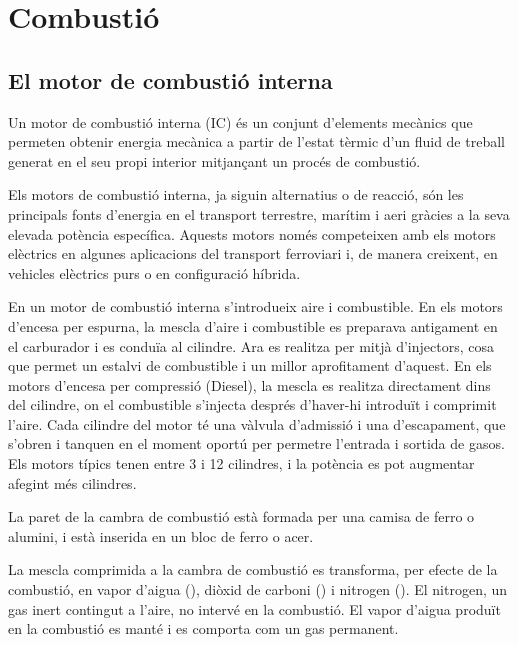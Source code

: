 \chapter{Combustió}

\tableofcontents\newpage

\section{El motor de combustió interna}

Un motor de combustió interna (IC) és un conjunt d'elements mecànics que permeten obtenir energia mecànica a partir de l'estat tèrmic d'un fluid de treball generat en el seu propi interior mitjançant un procés de combustió.
 
Els motors de combustió interna, ja siguin alternatius o de reacció, són les principals fonts d'energia en el transport terrestre, marítim i aeri gràcies a la seva elevada potència específica. Aquests motors només competeixen amb els motors elèctrics en algunes aplicacions del transport ferroviari i, de manera creixent, en vehicles elèctrics purs o en configuració híbrida\cite{de_antonio_motores_2015}. 

En un motor de combusti\'o interna s'introdueix aire i combustible. En els motors d'encesa per espurna, la mescla d'aire i combustible es preparava antigament en el carburador i es condu\"ia al cilindre. Ara es realitza per mitj\`a d'injectors, cosa que permet un estalvi de combustible i un millor aprofitament d'aquest. En els motors d'encesa per compressi\'o (Diesel), la mescla es realitza directament dins del cilindre, on el combustible s'injecta despr\'es d'haver-hi introdu\"it i comprimit l'aire. Cada cilindre del motor t\'e una v\`alvula d'admissi\'o i una d'escapament, que s'obren i tanquen en el moment oport\'u per permetre l'entrada i sortida de gasos. Els motors típics tenen entre 3 i 12 cilindres, i la pot\`encia es pot augmentar afegint m\'es cilindres.

La paret de la cambra de combustió està formada per una camisa de ferro o alumini, i està inserida en un bloc de ferro o acer.

La mescla comprimida a la cambra de combusti\'o es transforma, per efecte de la combusti\'o, en vapor d'aigua (), di\`oxid de carboni () i nitrogen (). El nitrogen, un gas inert contingut a l'aire, no interv\'e en la combusti\'o. El vapor d'aigua produ\"it en la combusti\'o es mant\'e i es comporta com un gas permanent.

